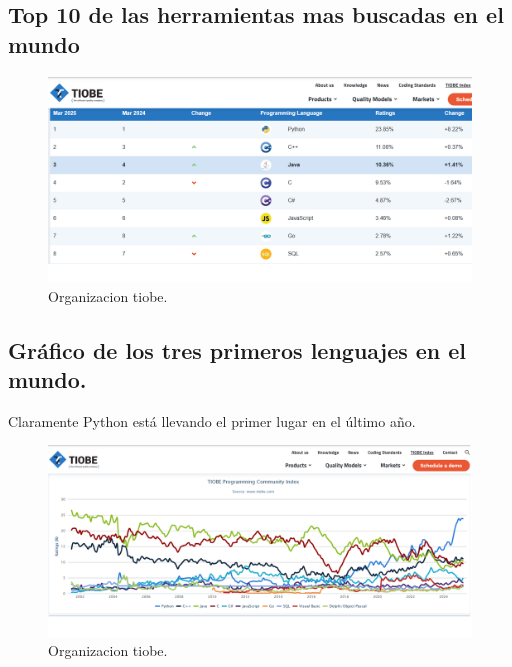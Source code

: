 \subsection{Top 10 de las herramientas mas buscadas en el mundo}

\begin{figure}[H]
    \begin{center}
    \includegraphics[scale = .4]{./images/tiobe.1.png}
    \caption{Organizacion tiobe.}
    \label{fig:huella}
    \end{center}
    \end{figure}

\subsection{Gráfico de los tres primeros lenguajes en el mundo.} 

Claramente Python está llevando el primer lugar en el último año. \\

\begin{figure}[H]
    \begin{center}
    \includegraphics[scale = .4]{./images/tiobe.png}
    \caption{Organizacion tiobe.}
    \label{fig:huella}
    \end{center}
    \end{figure}
